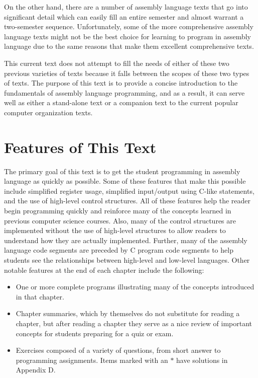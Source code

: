 \documentclass[10pt]{book}
\begin{document}
On the other hand, there are a number of assembly language texts that go into significant detail which can easily fill an entire semester and almost warrant a two-semester sequence. Unfortunately, some of the more comprehensive assembly language texts might not be the best choice for learning to program in assembly language due to the same reasons that make them excellent comprehensive texts.

This current text does not attempt to fill the needs of either of these two previous varieties of texts because it falls between the scopes of these two types of texts. The purpose of this text is to provide a concise introduction to the fundamentals of assembly language programming, and as a result, it can serve well as either a stand-alone text or a companion text to the current popular computer organization texts.

\section*{Features of This Text}
The primary goal of this text is to get the student programming in assembly language as quickly as possible. Some of these features that make this possible include simplified register usage, simplified input/output using C-like statements, and the use of high-level control structures. All of these features help the reader begin programming quickly and reinforce many of the concepts learned in previous computer science courses. Also, many of the control structures are implemented without the use of high-level structures to allow readers to understand how they are actually implemented. Further, many of the assembly language code segments are preceded by C program code segments to help students see the relationships between high-level and low-level languages. Other notable features at the end of each chapter include the following:

\begin{itemize}
  \item One or more complete programs illustrating many of the concepts introduced in that chapter.
  \item Chapter summaries, which by themselves do not substitute for reading a chapter, but after reading a chapter they serve as a nice review of important concepts for students preparing for a quiz or exam.
  \item Exercises composed of a variety of questions, from short answer to programming assignments. Items marked with an $*$ have solutions in Appendix D.
\end{itemize}
\end{document}
